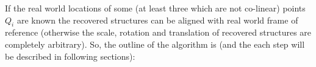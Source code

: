 \documentclass[12pt]{article}
\begin{document}

If the real world locations of some (at least three which are not co-linear)
points $Q_i$ are known the recovered structures can be aligned with real world
frame of reference (otherwise the scale, rotation and translation of recovered
structures are completely arbitrary). So, the outline of the algorithm is (and
the each step will be described in following sections):
\end{document}
